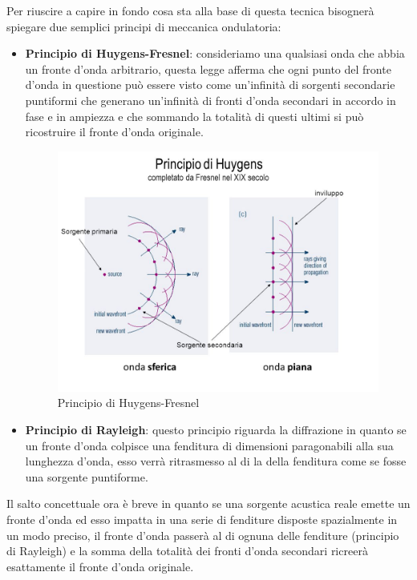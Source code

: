 \documentclass[12pt,a4paper]{report}
\begin{document}
Per riuscire a capire in fondo cosa sta alla base di questa tecnica bisognerà spiegare due semplici principi di meccanica ondulatoria: 

\begin{itemize}

\item \textbf{Principio di Huygens-Fresnel}: consideriamo una qualsiasi onda che abbia un fronte d'onda arbitrario, questa legge afferma che ogni punto del fronte d'onda in questione può essere visto come un'infinità di sorgenti secondarie puntiformi che generano un'infinità di fronti d'onda secondari in accordo in fase e in ampiezza e che sommando la totalità di questi ultimi si può ricostruire il fronte d'onda originale.



\begin{figure}[htbp]
	\centering
	\includegraphics[scale=0.35]{figures/huygens.jpg}
	\caption {Principio di Huygens-Fresnel} 
	\label{fig:huygens}
	\end{figure}

\item \textbf{Principio di Rayleigh}: questo principio riguarda la diffrazione in quanto se un fronte d'onda colpisce una fenditura di dimensioni paragonabili alla sua lunghezza d'onda, esso verrà ritrasmesso al di la della fenditura come se fosse una sorgente puntiforme.

\end{itemize}

Il salto concettuale ora è breve in quanto se una sorgente acustica reale emette un fronte d'onda ed esso impatta in una serie di fenditure disposte spazialmente in un modo preciso, il fronte d'onda passerà al di ognuna delle fenditure (principio di Rayleigh) e la somma della totalità dei fronti d'onda secondari ricreerà esattamente il fronte d'onda originale.
\end{document}

